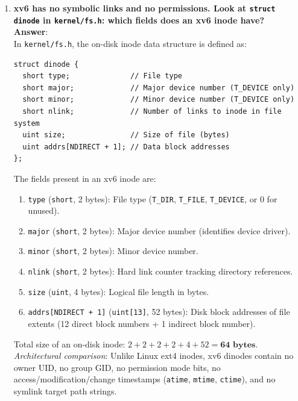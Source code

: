 \documentclass[12pt,a4paper]{article}
\begin{document}
\begin{enumerate}
    \item \textbf{xv6 has no symbolic links and no permissions. Look at \texttt{struct dinode} in \texttt{kernel/fs.h}: which fields does an xv6 inode have?} \\
    \textbf{Answer}: \\
    In \texttt{kernel/fs.h}, the on-disk inode data structure is defined as:
    \begin{lstlisting}[style=cstyle]
struct dinode {
  short type;              // File type
  short major;             // Major device number (T_DEVICE only)
  short minor;             // Minor device number (T_DEVICE only)
  short nlink;             // Number of links to inode in file system
  uint size;               // Size of file (bytes)
  uint addrs[NDIRECT + 1]; // Data block addresses
};
    \end{lstlisting}
    The fields present in an xv6 inode are:
    \begin{enumerate}
        \item \texttt{type} (\texttt{short}, 2 bytes): File type (\texttt{T\_DIR}, \texttt{T\_FILE}, \texttt{T\_DEVICE}, or 0 for unused).
        \item \texttt{major} (\texttt{short}, 2 bytes): Major device number (identifies device driver).
        \item \texttt{minor} (\texttt{short}, 2 bytes): Minor device number.
        \item \texttt{nlink} (\texttt{short}, 2 bytes): Hard link counter tracking directory references.
        \item \texttt{size} (\texttt{uint}, 4 bytes): Logical file length in bytes.
        \item \texttt{addrs[NDIRECT + 1]} (\texttt{uint[13]}, 52 bytes): Disk block addresses of file extents (12 direct block numbers + 1 indirect block number).
    \end{enumerate}
    Total size of an on-disk inode: $2 + 2 + 2 + 2 + 4 + 52 = \mathbf{64\text{ bytes}}$. \\
    \textit{Architectural comparison}: Unlike Linux ext4 inodes, xv6 dinodes contain no owner UID, no group GID, no permission mode bits, no access/modification/change timestamps (\texttt{atime}, \texttt{mtime}, \texttt{ctime}), and no symlink target path strings.
\end{enumerate}

\newpage

\end{document}
